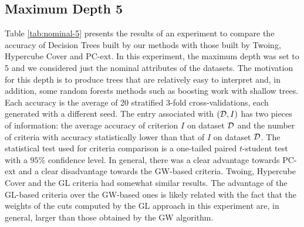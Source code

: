 \subsection{Maximum Depth 5}

Table \ref{tab:nominal-5} presents  the results of an experiment to
compare the accuracy of  Decision Trees built by  our methods with those built by Twoing, Hypercube Cover and PC-ext.
In this experiment, the maximum depth was set to 5 and we considered just the nominal attributes of the datasets. 
The motivation for this depth is to produce trees that
are relatively easy to interpret and, in addition, some random
forests methods such as boosting work with shallow trees.
Each accuracy is the average of 20 stratified 3-fold cross-validations,
each generated with a different seed.
The entry  associated with  $({\cal D},I)$ has two pieces of information: the average accuracy
of criterion $I$ on dataset ${\cal D}$ and the number of criteria
with accuracy   statistically lower than that of $I$ on dataset ${\cal D}$. 
The statistical test used for criteria comparison is a  one-tailed paired $t$-student test with a $95\% $ confidence level. 
In general, there was a clear advantage towards PC-ext and a clear disadvantage towards the GW-based criteria. Twoing, Hypercube Cover and the GL criteria had somewhat similar results. The advantage of the GL-based criteria over the GW-based ones is likely related with the fact that the weights of the cuts computed by the GL approach in this experiment are, in general, larger than those obtained by the GW algorithm.


